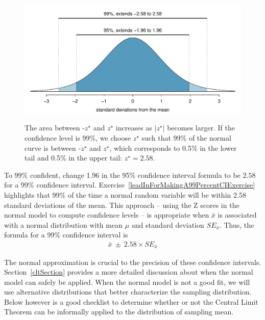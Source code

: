 \begin{figure}
\centering
\includegraphics[width=\textwidth]{ch_inference_foundations_oi_biostat/figures/choosingZForCI/choosingZForCI}
\label{choosingZForCI}
\caption{The area between -$z^{\star}$ and $z^{\star}$ increases as $|z^{\star}|$ becomes larger. If the confidence level is 99\%, we choose $z^{\star}$ such that 99\% of the normal curve is between -$z^{\star}$ and $z^{\star}$, which corresponds to 0.5\% in the lower tail and 0.5\% in the upper tail: $z^{\star}=2.58$.}
\end{figure}


To 99\% confident, change 1.96 in the 95\% confidence interval formula to be $2.58$ for a 99\% confidence interval. Exercise~\ref{leadInForMakingA99PercentCIExercise} highlights that 99\% of the time a normal random variable will be within 2.58 standard deviations of the mean. This approach -- using the Z scores in the normal model to compute confidence levels -- is appropriate when $\bar{x}$ is associated with a normal distribution with mean $\mu$ and standard deviation $SE_{\bar{x}}$. Thus, the formula for a 99\% confidence interval is
\begin{eqnarray}
\bar{x}\ \pm\ 2.58\times SE_{\bar{x}}
\label{99PercCIForMean}
\end{eqnarray}

The normal approximation is crucial to the precision of these confidence intervals. Section~\ref{cltSection} provides a more detailed discussion about when the normal model can safely be applied. When the normal model is not a good fit, we will use alternative distributions that better characterize the sampling distribution. Below however is a good checklist to determine whether or not the Central Limit Theorem can be informally applied to the distribution of sampling mean.

